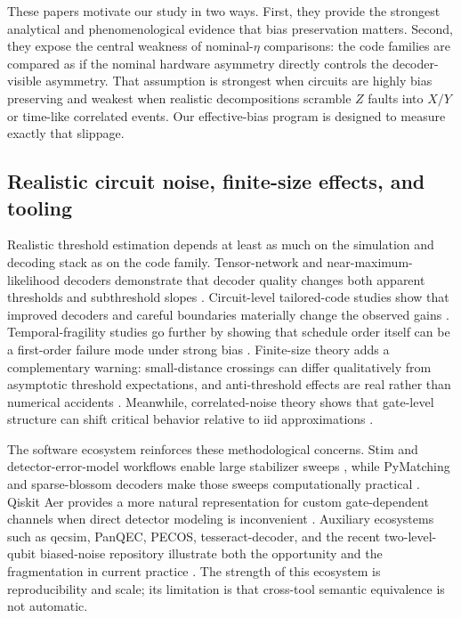 \documentclass{article} %
\begin{document}
These papers motivate our study in two ways. First, they provide the strongest analytical and phenomenological evidence that bias preservation matters. Second, they expose the central weakness of nominal-$\eta$ comparisons: the code families are compared as if the nominal hardware asymmetry directly controls the decoder-visible asymmetry. That assumption is strongest when circuits are highly bias preserving and weakest when realistic decompositions scramble $Z$ faults into $X/Y$ or time-like correlated events. Our effective-bias program is designed to measure exactly that slippage.

\subsection{Realistic circuit noise, finite-size effects, and tooling}

Realistic threshold estimation depends at least as much on the simulation and decoding stack as on the code family. Tensor-network and near-maximum-likelihood decoders demonstrate that decoder quality changes both apparent thresholds and subthreshold slopes \citep{bravyi2014_mld_surface,darmawan2018_tensor_network}. Circuit-level tailored-code studies show that improved decoders and careful boundaries materially change the observed gains \citep{higgott2023_improved_decoding}. Temporal-fragility studies go further by showing that schedule order itself can be a first-order failure mode under strong bias \citep{tsai2024_temporal_fragility}. Finite-size theory adds a complementary warning: small-distance crossings can differ qualitatively from asymptotic threshold expectations, and anti-threshold effects are real rather than numerical accidents \citep{robertson2017_small_memories,xiao2024_finite_size_corrections}. Meanwhile, correlated-noise theory shows that gate-level structure can shift critical behavior relative to iid approximations \citep{chubb2021_correlated_noise}.

The software ecosystem reinforces these methodological concerns. Stim and detector-error-model workflows enable large stabilizer sweeps \citep{gidney2021_stim_paper,stim_repo}, while PyMatching and sparse-blossom decoders make those sweeps computationally practical \citep{pymatching_repo,higgott2025_sparse_blossom}. Qiskit Aer provides a more natural representation for custom gate-dependent channels when direct detector modeling is inconvenient \citep{qiskit_aer_docs}. Auxiliary ecosystems such as qecsim, PanQEC, PECOS, tesseract-decoder, and the recent two-level-qubit biased-noise repository illustrate both the opportunity and the fragmentation in current practice \citep{qecsim_repo,panqec_repo,pecos_repo,tesseract_repo,qec_two_level_bias_repo}. The strength of this ecosystem is reproducibility and scale; its limitation is that cross-tool semantic equivalence is not automatic.
\end{document}
